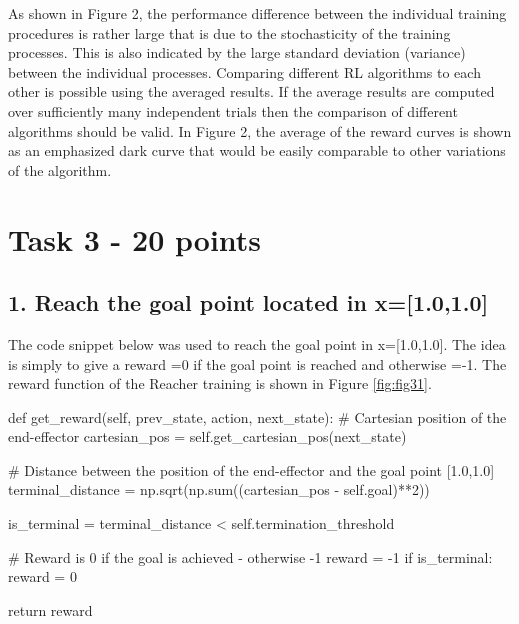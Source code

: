 \documentclass[12pt]{article}
\begin{document}
\noindent
As shown in Figure 2, the performance difference between the individual training procedures is rather large that is due to the stochasticity of the training processes. This is also indicated by the large standard deviation (variance) between the individual processes. Comparing different RL algorithms to each other is possible using the averaged results. If the average results are computed over sufficiently many independent trials then the comparison of different algorithms should be valid. In Figure 2, the average of the reward curves is shown as an emphasized dark curve that would be easily comparable to other variations of the algorithm.  



\pagebreak
\section*{Task 3 - 20 points}

\subsection*{1. Reach the goal point located in x=[1.0,1.0]}

The code snippet below was used to reach the goal point in x=[1.0,1.0]. The idea is simply to give a reward =0 if the goal point is reached and otherwise =-1. 
The reward function of the Reacher training is shown in Figure \ref*{fig:fig31}.
\newline

\begin{pycode}
def get_reward(self, prev_state, action, next_state):
        # Cartesian position of the end-effector
        cartesian_pos = self.get_cartesian_pos(next_state)
  
        # Distance between the position of the end-effector and the goal point [1.0,1.0]
        terminal_distance = np.sqrt(np.sum((cartesian_pos - self.goal)**2))

        is_terminal = terminal_distance < self.termination_threshold

        # Reward is 0 if the goal is achieved - otherwise -1
        reward = -1
        if is_terminal: 
            reward = 0

        return reward
\end{pycode}

\noindent  
\end{document}
